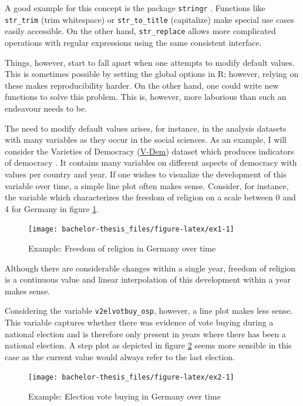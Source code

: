 \documentclass[]{report}
\theoremstyle{definition}
\theoremstyle{definition}
\theoremstyle{definition}
\theoremstyle{remark}
\begin{document}
A good example for this concept is the package \texttt{stringr}
\citep{stringr}. Functions like \texttt{str\_trim} (trim whitespace) or
\texttt{str\_to\_title} (capitalize) make special use cases easily
accessible. On the other hand, \texttt{str\_replace} allows more
complicated operations with regular expressions using the same
consistent interface.

Things, however, start to fall apart when one attempts to modify default
values. This is sometimes possible by setting the global options in R;
however, relying on these makes reproducibility harder. On the other
hand, one could write new functions to solve this problem. This is,
however, more laborious than such an endeavour needs to be.

The need to modify default values arises, for instance, in the analysis
datasets with many variables as they occur in the social sciences. As an
example, I will consider the Varieties of Democracy
(\href{v-dem.net}{V-Dem}) dataset which produces indicators of democracy
\citep[\citet{Pemstein2018}]{vdem2018}. It contains many variables on
different aspects of democracy with values per country and year. If one
wishes to visualize the development of this variable over time, a simple
line plot often makes sense. Consider, for instance, the variable which
characterizes the freedom of religion on a scale between 0 and 4 for
Germany in figure \ref{fig:ex1}.

\begin{figure}

{\centering \texttt{[image: bachelor-thesis\_files/figure-latex/ex1-1]} 

}

\caption{Example: Freedom of religion in Germany over time}\label{fig:ex1}
\end{figure}

Although there are considerable changes within a single year, freedom of
religion is a continuous value and linear interpolation of this
development within a year makes sense.

Considering the variable \texttt{v2elvotbuy\_osp}, however, a line plot
makes less sense. This variable captures whether there was evidence of
vote buying during a national election and is therefore only present in
years where there has been a national election. A step plot as depicted
in figure \ref{fig:ex2} seems more sensible in this case as the current
value would always refer to the last election.

\begin{figure}

{\centering \texttt{[image: bachelor-thesis\_files/figure-latex/ex2-1]} 

}

\caption{Example: Election vote buying in Germany over time}\label{fig:ex2}
\end{figure}
\end{document}
